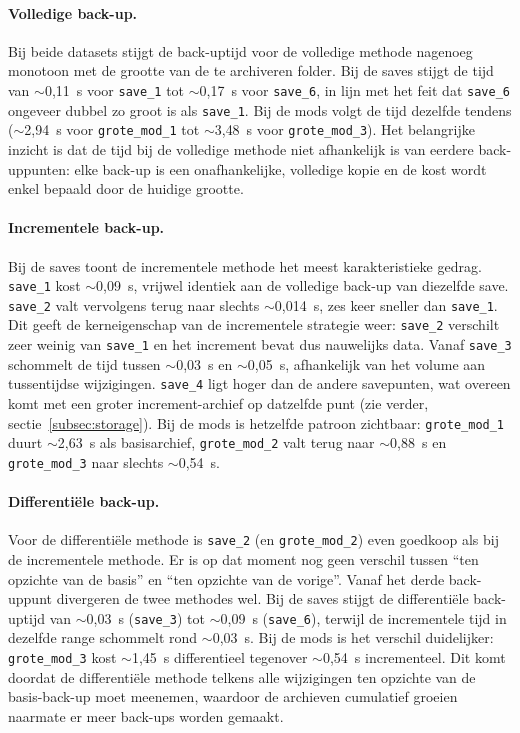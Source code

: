 \paragraph{Volledige back-up.}
Bij beide datasets stijgt de back-uptijd voor de volledige methode nagenoeg monotoon met de grootte van de te archiveren folder. Bij de saves stijgt de tijd van $\sim$0{,}11~s voor \texttt{save\_1} tot $\sim$0{,}17~s voor \texttt{save\_6}, in lijn met het feit dat \texttt{save\_6} ongeveer dubbel zo groot is als \texttt{save\_1}. Bij de mods volgt de tijd dezelfde tendens ($\sim$2{,}94~s voor \texttt{grote\_mod\_1} tot $\sim$3{,}48~s voor \texttt{grote\_mod\_3}). Het belangrijke inzicht is dat de tijd bij de volledige methode niet afhankelijk is van eerdere back-uppunten: elke back-up is een onafhankelijke, volledige kopie en de kost wordt enkel bepaald door de huidige grootte.

\paragraph{Incrementele back-up.}
Bij de saves toont de incrementele methode het meest karakteristieke gedrag. \texttt{save\_1} kost $\sim$0{,}09~s, vrijwel identiek aan de volledige back-up van diezelfde save. \texttt{save\_2} valt vervolgens terug naar slechts $\sim$0{,}014~s, zes keer sneller dan \texttt{save\_1}. Dit geeft de kerneigenschap van de incrementele strategie weer: \texttt{save\_2} verschilt zeer weinig van \texttt{save\_1} en het increment bevat dus nauwelijks data. Vanaf \texttt{save\_3} schommelt de tijd tussen $\sim$0{,}03~s en $\sim$0{,}05~s, afhankelijk van het volume aan tussentijdse wijzigingen. \texttt{save\_4} ligt hoger dan de andere savepunten, wat overeen komt met een groter increment-archief op datzelfde punt (zie verder, sectie~\ref{subsec:storage}). Bij de mods is hetzelfde patroon zichtbaar: \texttt{grote\_mod\_1} duurt $\sim$2{,}63~s als basisarchief, \texttt{grote\_mod\_2} valt terug naar $\sim$0{,}88~s en \texttt{grote\_mod\_3} naar slechts $\sim$0{,}54~s.

\paragraph{Differentiële back-up.}
Voor de differentiële methode is \texttt{save\_2} (en \texttt{grote\_mod\_2}) even goedkoop als bij de incrementele methode. Er is op dat moment nog geen verschil tussen ``ten opzichte van de basis'' en ``ten opzichte van de vorige''. Vanaf het derde back-uppunt divergeren de twee methodes wel. Bij de saves stijgt de differentiële back-uptijd van $\sim$0{,}03~s (\texttt{save\_3}) tot $\sim$0{,}09~s (\texttt{save\_6}), terwijl de incrementele tijd in dezelfde range schommelt rond $\sim$0{,}03~s. Bij de mods is het verschil duidelijker: \texttt{grote\_mod\_3} kost $\sim$1{,}45~s differentieel tegenover $\sim$0{,}54~s incrementeel. Dit komt doordat de differentiële methode telkens alle wijzigingen ten opzichte van de basis-back-up moet meenemen, waardoor de archieven cumulatief groeien naarmate er meer back-ups worden gemaakt.

